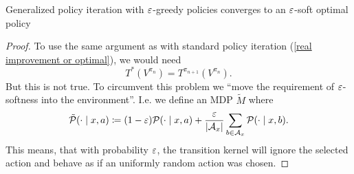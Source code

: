 \begin{prop}
	Generalized policy iteration with \(\varepsilon\)-greedy policies converges to an \(\varepsilon\)-soft optimal policy
\end{prop}
\begin{proof}
	To use the same argument as with standard policy iteration (\ref{real improvement or optimal}), we would need
	\[
		T^*(V^{\pi_n})=T^{\pi_{n+1}}(V^{\pi_n}).
	\]
	But this is not true. To circumvent this problem we ``move the requirement of \(\varepsilon\)-softness into the environment''. I.e. we define an MDP \(\tilde{M}\) where
	\[
		\tilde{\mathcal{P}}(\cdot \mid x,a) \coloneqq (1-\varepsilon) \mathcal{P}(\cdot \mid x,a) 
		+ \frac{\varepsilon}{|\mathcal{A}_x|}\sum_{b\in\mathcal{A}_x} \mathcal{P}(\cdot \mid x,b).
	\]
	This means, that with probability \(\varepsilon\), the transition kernel will ignore the selected action and behave as if an uniformly random action was chosen.	
	

\end{proof}
